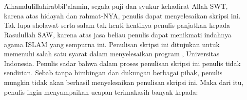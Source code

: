 \chapter*{\kataPengantar}
\f{Alhamdulillahirabbil'alamin}, segala puji dan syukur kehadirat Allah SWT, karena atas hidayah dan rahmat-NYA, penulis dapat menyelesaikan skripsi ini. Tak lupa sholawat serta salam tak henti-hentinya penulis panjatkan kepada Rasulullah SAW, karena atas jasa beliau penulis dapat menikmati indahnya agama ISLAM yang sempurna ini. Penulisan skripsi ini ditujukan untuk memenuhi salah satu syarat dalam menyelesaikan program \gelar, Universitas Indonesia. Penulis sadar bahwa dalam proses penulisan skripsi ini penulis tidak sendirian. Sebab tanpa bimbingan dan dukungan berbagai pihak, penulis mungkin tidak akan berhasil menyelesaikan penulisan skripsi ini. Maka dari itu, penulis ingin menyampaikan ucapan terimakasih banyak kepada: 
